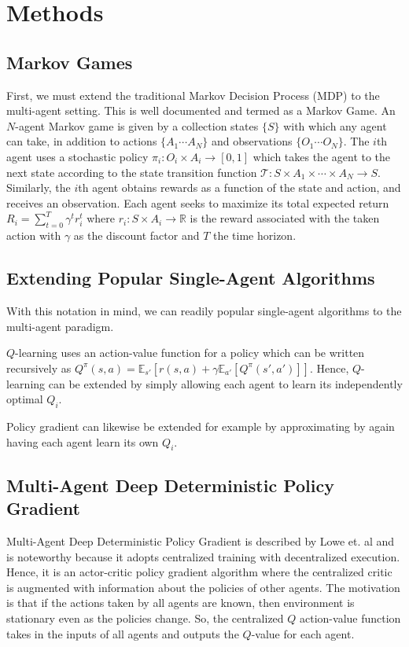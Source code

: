 \documentclass{llncs}
\begin{document}
\section{Methods}
\subsection{Markov Games}
First, we must extend the traditional Markov Decision Process (MDP) to the multi-agent setting. This is well documented and termed as a Markov Game\cite{leibo2017multi}. An $N$-agent Markov game is given by a collection states $\{ S \}$ with which any agent can take, in addition to actions $\{ A_1 \cdots A_N \}$ and observations $\{ O_1 \cdots O_N \}$. The $i$th agent uses a stochastic policy $\pi_i : O_i \times A_i \rightarrow [0,1]$ which takes the agent to the next state according to the state transition function $\mathcal{T}: S \times A_1 \times \cdots \times A_N \rightarrow S$. Similarly, the $i$th agent obtains rewards as a function of the state and action, and receives an observation. Each agent seeks to maximize its total expected return $R_i = \sum_{t=0}^T \gamma^t r_i^t$ where $r_i : S \times A_i \rightarrow \mathbb{R}$ is the reward associated with the taken action with $\gamma$ as the discount factor and $T$ the time horizon.  
%
\subsection{Extending Popular Single-Agent Algorithms}
With this notation in mind, we can readily popular single-agent algorithms to the multi-agent paradigm.

$Q$-learning uses an action-value function for a policy which can be written recursively as $Q^\pi(s,a)= \mathbb{E}_{s'}[r(s,a) + \gamma \mathbb{E}_{a'}[Q^\pi(s', a')]]$. Hence, $Q$-learning can be extended by simply allowing each agent to learn its independently optimal $Q_i$. 

Policy gradient can likewise be extended for example by approximating by again having each agent learn its own $Q_i$. 

\subsection{Multi-Agent Deep Deterministic Policy Gradient}

Multi-Agent Deep Deterministic Policy Gradient is described by Lowe et. al\cite{lowe2017multi} and is noteworthy because it adopts centralized training with decentralized execution. Hence, it is an actor-critic policy gradient algorithm where the centralized critic is augmented with information about the policies of other agents. The motivation is that if the actions taken by all agents are known, then environment is stationary even as the policies change. So, the centralized $Q$ action-value function takes in the inputs of all agents and outputs the $Q$-value for each agent. 
\end{document}
